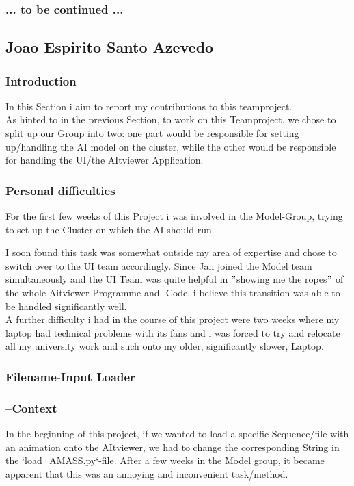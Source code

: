 \documentclass[a4paper]{scrartcl}
\begin{document}
\subsubsection*{... to be continued ...}


\subsection*{Joao Espirito Santo Azevedo}
\subsubsection*{Introduction}
In this Section i aim to report my contributions to this teamproject.\\
As hinted to in the previous Section, to work on this Teamproject, we chose to split up our Group into two: one part would be responsible for setting up/handling the AI model on the cluster, while the other would be responsible for handling the UI/the AItviewer Application.

\subsubsection*{Personal difficulties}
\quad For the first few weeks of this Project i was involved in the Model-Group, trying to set up the Cluster on which the AI should run.

\quad I soon found this task was somewhat outside my area of expertise and chose to switch over to the UI team accordingly. Since Jan joined the Model team simultaneously and the UI Team was quite helpful in $"$showing me the ropes$"$ of the whole Aitviewer-Programme and -Code, i believe this transition was able to be handled significantly well.\\

\quad A further difficulty i had in the course of this project were two weeks where my laptop had technical problems with its fans and i was forced to try and relocate all my university work and such onto my older, significantly slower, Laptop.

\subsubsection*{Filename-Input Loader}
\subsubsection*{--Context}
\quad In the beginning of this project, if we wanted to load a specific Sequence/file with an animation onto the AItviewer, we had to change the corresponding String in the `load\_AMASS.py`-file. After a few weeks in the Model group, it became apparent that this was an annoying and inconvenient task/method.
\end{document}
